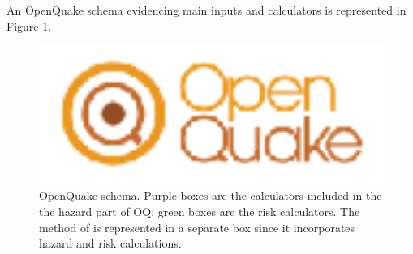 An OpenQuake schema evidencing main inputs and calculators is represented in 
Figure \ref{fig:openquake_schema}.
\begin{figure}
\includegraphics[width=17cm,angle=90]{./Figures/openquake_logo1.eps}
\caption{OpenQuake schema. Purple boxes are the calculators included in the  
the hazard part of OQ; green boxes are the risk calculators. The method of 
\citet{wesson2009} is represented in a separate box since it incorporates 
hazard and risk calculations.}
\label{fig:openquake_schema}
\end{figure}
